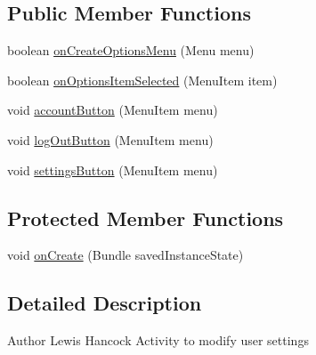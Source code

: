 \subsection*{Public Member Functions}
\begin{DoxyCompactItemize}
\item 
boolean \hyperlink{classuk_1_1ac_1_1swan_1_1digitaltrails_1_1activities_1_1_settings_activity_a6c32c6f4d1b544c20072de0b26dbd012}{on\+Create\+Options\+Menu} (Menu menu)
\item 
boolean \hyperlink{classuk_1_1ac_1_1swan_1_1digitaltrails_1_1activities_1_1_settings_activity_abf85a8e972a577387d200151e04478be}{on\+Options\+Item\+Selected} (Menu\+Item item)
\item 
void \hyperlink{classuk_1_1ac_1_1swan_1_1digitaltrails_1_1activities_1_1_settings_activity_ac2b1ab95450abe65a3d13103432cf123}{account\+Button} (Menu\+Item menu)
\item 
void \hyperlink{classuk_1_1ac_1_1swan_1_1digitaltrails_1_1activities_1_1_settings_activity_ac38ed518ecf1b7a272e5153de63e4782}{log\+Out\+Button} (Menu\+Item menu)
\item 
void \hyperlink{classuk_1_1ac_1_1swan_1_1digitaltrails_1_1activities_1_1_settings_activity_acffdd47e278d3277de1e9086c22dc66b}{settings\+Button} (Menu\+Item menu)
\end{DoxyCompactItemize}
\subsection*{Protected Member Functions}
\begin{DoxyCompactItemize}
\item 
void \hyperlink{classuk_1_1ac_1_1swan_1_1digitaltrails_1_1activities_1_1_settings_activity_a09eb5764122b21fbaead0a051561265b}{on\+Create} (Bundle saved\+Instance\+State)
\end{DoxyCompactItemize}


\subsection{Detailed Description}
\begin{DoxyAuthor}{Author}
Lewis Hancock Activity to modify user settings 
\end{DoxyAuthor}


